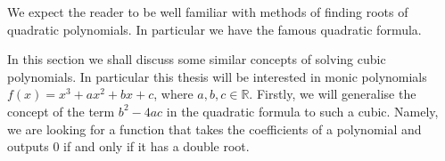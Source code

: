 We expect the reader to be well familiar with methods of
finding roots of quadratic polynomials.
In particular we have the famous quadratic formula.

In this section we shall discuss some similar concepts of solving
cubic polynomials. In particular this thesis will be interested
in monic polynomials $f(x) = x^3 + ax^2 + bx + c$, where $a, b, c \in \mathbb{R}$.
Firstly, we will generalise the concept of the term $b^2 - 4ac$ in
the quadratic formula to such a cubic. Namely, we are looking
for a function that takes the coefficients of a polynomial
and outputs 0 if and only if it has a double root.
